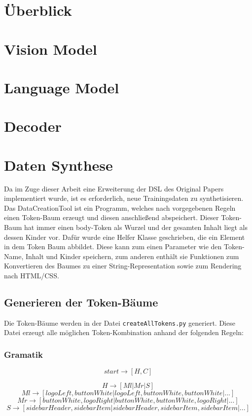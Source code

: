 \documentclass[pdftex,a4paper,halfparskip]{scrartcl}
\begin{document}
\section{Überblick}

\section{Vision Model}
\section{Language Model}
\section{Decoder}
\section{Daten Synthese}

Da im Zuge dieser Arbeit eine Erweiterung der DSL des Original Papers implementiert wurde, ist es erforderlich, neue Trainingsdaten zu synthetisieren. Das DataCreationTool ist ein Programm, welches nach vorgegebenen Regeln einen Token-Baum erzeugt und diesen anschließend abspeichert. Dieser Token-Baum hat immer einen body-Token als Wurzel und der gesamten Inhalt liegt als dessen Kinder vor. Dafür wurde eine Helfer Klasse geschrieben, die ein Element in dem Token Baum abbildet. Diese kann zum einen Parameter wie den Token-Name, Inhalt und Kinder speichern, zum anderen enthält sie Funktionen zum Konvertieren des Baumes zu einer String-Representation sowie zum Rendering nach HTML/CSS. 

\subsection{Generieren der Token-Bäume}
Die Token-Bäume werden in der Datei \texttt{createAllTokens.py} generiert. Diese Datei erzeugt alle möglichen Token-Kombination anhand der folgenden Regeln:

\subsubsection{Gramatik}

\begin{equation}
start \rightarrow [H,C]
\end{equation}

\begin{equation}
H \rightarrow [Ml | Mr | S]
\end{equation}
\begin{equation}
Ml \rightarrow  [ logoLeft, buttonWhite | logoLeft, buttonWhite, buttonWhite | ...]
\end{equation}
\begin{equation}
Mr \rightarrow [buttonWhite, logoRight | buttonWhite, buttonWhite, logoRight | ...]
\end{equation}
\begin{equation}
S \rightarrow [sidebarHeader, sidebarItem| sidebarHeader, sidebarItem, sidebarItem | ...]
\end{equation}
\end{document}
